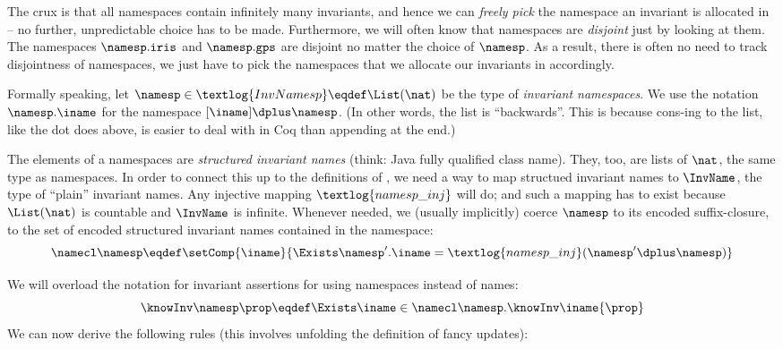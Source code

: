 The crux is that all namespaces contain infinitely many invariants, and hence we can \emph{freely pick} the namespace an invariant is allocated in -- no further, unpredictable choice has to be made.
Furthermore, we will often know that namespaces are \emph{disjoint} just by looking at them.
The namespaces $\namesp.\texttt{iris}$ and $\namesp.\texttt{gps}$ are disjoint no matter the choice of $\namesp$.
As a result, there is often no need to track disjointness of namespaces, we just have to pick the namespaces that we allocate our invariants in accordingly.

Formally speaking, let $\namesp \in \textlog{InvNamesp} \eqdef \List(\nat)$ be the type of \emph{invariant namespaces}.
We use the notation $\namesp.\iname$ for the namespace $[\iname] \dplus \namesp$.
(In other words, the list is ``backwards''. This is because cons-ing to the list, like the dot does above, is easier to deal with in Coq than appending at the end.)

The elements of a namespaces are \emph{structured invariant names} (think: Java fully qualified class name).
They, too, are lists of $\nat$, the same type as namespaces.
In order to connect this up to the definitions of , we need a way to map structued invariant names to $\InvName$, the type of ``plain'' invariant names.
Any injective mapping $\textlog{namesp\_inj}$ will do; and such a mapping has to exist because $\List(\nat)$ is countable and $\InvName$ is infinite.
Whenever needed, we (usually implicitly) coerce $\namesp$ to its encoded suffix-closure, \ie to the set of encoded structured invariant names contained in the namespace: \[\namecl\namesp \eqdef \setComp{\iname}{\Exists \namesp'. \iname = \textlog{namesp\_inj}(\namesp' \dplus \namesp)}\]

We will overload the notation for invariant assertions for using namespaces instead of names:
\[ \knowInv\namesp\prop \eqdef \Exists \iname \in \namecl\namesp. \knowInv\iname{\prop} \]
We can now derive the following rules (this involves unfolding the definition of fancy updates):

